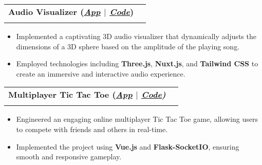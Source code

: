 \documentclass[a4paper,10pt]{article}
\makeatletter
\newcommand{\resumeSubheading}[4]{
  \vspace{-1pt}\item
    \begin{tabular*}{0.97\textwidth}[t]{l@{\extracolsep{\fill}}r}
      \textbf{#1} & #2 \\
      \textit{\normalsize#3} & \textit{\normalsize #4} \\
    \end{tabular*}\vspace{-7pt}
}
\makeatother
\begin{document}
\resumeSubheading
{Audio Visualizer (\textit{\href{https://audio-visualizer-threejs.netlify.app/}{\textbf{\underline{App}}} $|$ \href{https://github.com/AnkushSarkar10/audio_vis_threejs}{\textbf{\underline{Code}}}})}{}{}{}
\vspace{-15pt}
\begin{itemize}[leftmargin=0.15in]
  \item Implemented a captivating 3D audio visualizer that dynamically adjusts the dimensions of a 3D sphere based on the amplitude of the playing song.
  \item Employed technologies including \textbf{Three.js}, \textbf{Nuxt.js}, and \textbf{Tailwind CSS} to create an immersive and interactive audio experience.
\end{itemize}
\vspace{-5pt}

\resumeSubheading
{Multiplayer Tic Tac Toe (\textit{\href{https://vue-flask-tic-tac-toe.web.app/}{\textbf{\underline{App}}} $|$ \href{https://github.com/AnkushSarkar10/vue-flask-tic-tac-toe}{\textbf{\underline{Code}}})}}{}{}{}
\vspace{-15pt}
\begin{itemize}[leftmargin=0.15in]
  \item Engineered an engaging online multiplayer Tic Tac Toe game, allowing users to compete with friends and others in real-time.
  \item Implemented the project using \textbf{Vue.js} and \textbf{Flask-SocketIO}, ensuring smooth and responsive gameplay.
\end{itemize}
\vspace{-5pt}


\end{document}

